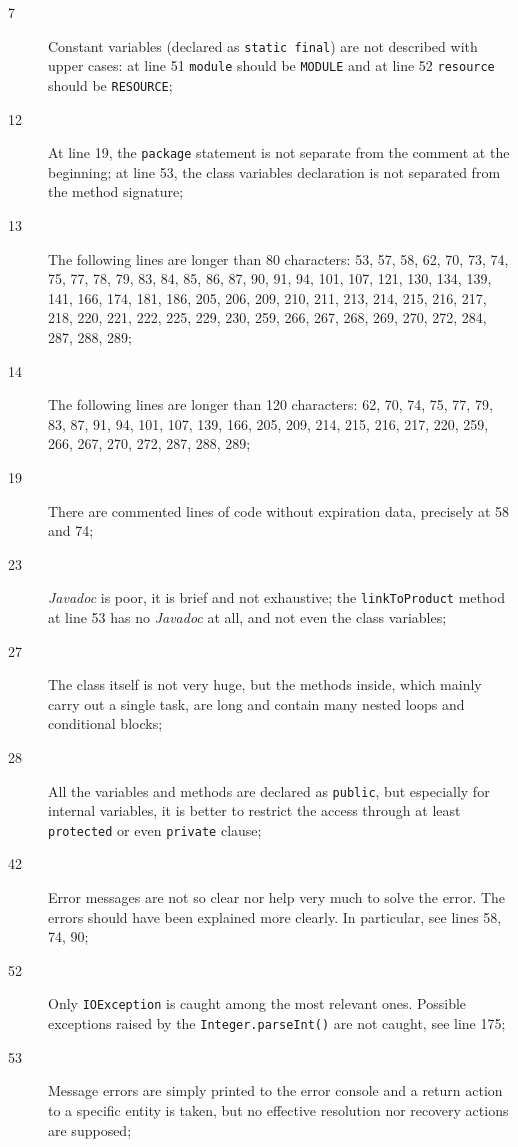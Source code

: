 \documentclass{scrreprt}
\begin{document}
\begin{description}
\item[7] Constant variables (declared as \texttt{static final}) are not described with upper cases: at line 51 \texttt{module} should be \texttt{MODULE} and at line 52 \texttt{resource} should be \texttt{RESOURCE};
\item[12] At line 19, the \texttt{package} statement is not separate from the comment at the beginning; at line 53, the class variables declaration is not separated from the method signature;
\item[13] The following lines are longer than 80 characters: 53, 57, 58, 62, 70, 73, 74, 75, 77, 78, 79, 83, 84, 85, 86, 87, 90, 91, 94, 101, 107, 121, 130, 134, 139, 141, 166, 174, 181, 186, 205, 206, 209, 210, 211, 213, 214, 215, 216, 217, 218, 220, 221, 222, 225, 229, 230, 259, 266, 267, 268, 269, 270, 272, 284, 287, 288, 289;
\item[14] The following lines are longer than 120 characters: 62, 70, 74, 75, 77, 79, 83, 87, 91, 94, 101, 107, 139, 166, 205, 209, 214, 215, 216, 217, 220, 259, 266, 267, 270, 272, 287, 288, 289;
\item[19] There are commented lines of code without expiration data, precisely at 58 and 74;
\item[23] \emph{Javadoc} is poor, it is brief and not exhaustive; the \texttt{linkToProduct} method at line 53 has no \emph{Javadoc} at all, and not even the class variables;
\item[27] The class itself is not very huge, but the methods inside, which mainly carry out a single task, are long and contain many nested loops and conditional blocks;
\item[28] All the variables and methods are declared as \texttt{public}, but especially for internal variables, it is better to restrict the access through at least \texttt{protected} or even \texttt{private} clause;
\item[42] Error messages are not so clear nor help very much to solve the error. The errors should have been explained more clearly. In particular, see lines 58, 74, 90;
\item[52] Only \texttt{IOException} is caught among the most relevant ones. Possible exceptions raised by the \texttt{Integer.parseInt()} are not caught, see line 175;
\item[53] Message errors are simply printed to the error console and a return action to a specific entity is taken, but no effective resolution nor recovery actions are supposed;

\end{description}
\end{document}
